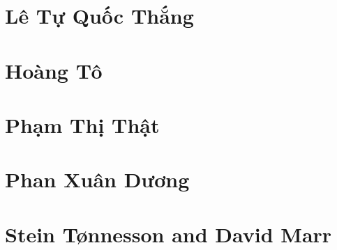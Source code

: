 \section{Lê Tự Quốc Thắng}


\section{Hoàng Tô}


\section{Phạm Thị Thật}


\section{Phan Xuân Dương}


\section{Stein Tønnesson and David Marr}



